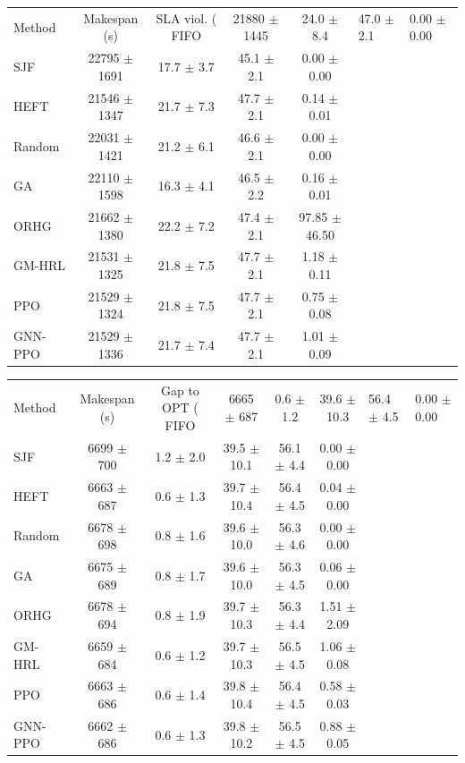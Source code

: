 \begin{tabular}{lcccc}
\toprule
Method & Makespan (s) & SLA viol. (%
\midrule
FIFO & 21880 $\pm$ 1445 & 24.0 $\pm$ 8.4 & 47.0 $\pm$ 2.1 & 0.00 $\pm$ 0.00 \\
SJF & 22795 $\pm$ 1691 & 17.7 $\pm$ 3.7 & 45.1 $\pm$ 2.1 & 0.00 $\pm$ 0.00 \\
HEFT & 21546 $\pm$ 1347 & 21.7 $\pm$ 7.3 & 47.7 $\pm$ 2.1 & 0.14 $\pm$ 0.01 \\
Random & 22031 $\pm$ 1421 & 21.2 $\pm$ 6.1 & 46.6 $\pm$ 2.1 & 0.00 $\pm$ 0.00 \\
GA & 22110 $\pm$ 1598 & 16.3 $\pm$ 4.1 & 46.5 $\pm$ 2.2 & 0.16 $\pm$ 0.01 \\
ORHG & 21662 $\pm$ 1380 & 22.2 $\pm$ 7.2 & 47.4 $\pm$ 2.1 & 97.85 $\pm$ 46.50 \\
GM-HRL & 21531 $\pm$ 1325 & 21.8 $\pm$ 7.5 & 47.7 $\pm$ 2.1 & 1.18 $\pm$ 0.11 \\
PPO & 21529 $\pm$ 1324 & 21.8 $\pm$ 7.5 & 47.7 $\pm$ 2.1 & 0.75 $\pm$ 0.08 \\
GNN-PPO & 21529 $\pm$ 1336 & 21.7 $\pm$ 7.4 & 47.7 $\pm$ 2.1 & 1.01 $\pm$ 0.09 \\
\bottomrule
\end{tabular}

\begin{tabular}{lccccc}
\toprule
Method & Makespan (s) & Gap to OPT (%
\midrule
FIFO & 6665 $\pm$ 687 & 0.6 $\pm$ 1.2 & 39.6 $\pm$ 10.3 & 56.4 $\pm$ 4.5 & 0.00 $\pm$ 0.00 \\
SJF & 6699 $\pm$ 700 & 1.2 $\pm$ 2.0 & 39.5 $\pm$ 10.1 & 56.1 $\pm$ 4.4 & 0.00 $\pm$ 0.00 \\
HEFT & 6663 $\pm$ 687 & 0.6 $\pm$ 1.3 & 39.7 $\pm$ 10.4 & 56.4 $\pm$ 4.5 & 0.04 $\pm$ 0.00 \\
Random & 6678 $\pm$ 698 & 0.8 $\pm$ 1.6 & 39.6 $\pm$ 10.0 & 56.3 $\pm$ 4.6 & 0.00 $\pm$ 0.00 \\
GA & 6675 $\pm$ 689 & 0.8 $\pm$ 1.7 & 39.6 $\pm$ 10.0 & 56.3 $\pm$ 4.5 & 0.06 $\pm$ 0.00 \\
ORHG & 6678 $\pm$ 694 & 0.8 $\pm$ 1.9 & 39.7 $\pm$ 10.3 & 56.3 $\pm$ 4.4 & 1.51 $\pm$ 2.09 \\
GM-HRL & 6659 $\pm$ 684 & 0.6 $\pm$ 1.2 & 39.7 $\pm$ 10.3 & 56.5 $\pm$ 4.5 & 1.06 $\pm$ 0.08 \\
PPO & 6663 $\pm$ 686 & 0.6 $\pm$ 1.4 & 39.8 $\pm$ 10.4 & 56.4 $\pm$ 4.5 & 0.58 $\pm$ 0.03 \\
GNN-PPO & 6662 $\pm$ 686 & 0.6 $\pm$ 1.3 & 39.8 $\pm$ 10.2 & 56.5 $\pm$ 4.5 & 0.88 $\pm$ 0.05 \\
\bottomrule
\end{tabular}

